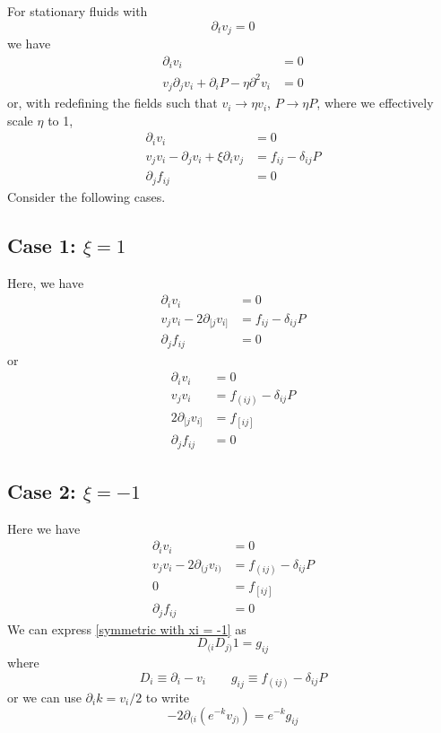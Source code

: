 \documentclass[10pt,a4paper]{article}
\begin{document}
For stationary fluids with
\begin{equation}
  \partial_t v_j = 0
\end{equation}
we have
\begin{align}
  \partial_i v_i  &=  0  \\
  v_j\partial_j v_i + \partial_i P - \eta\partial^2 v_i  &=  0
\end{align}
or, with redefining the fields such that $v_i \rightarrow \eta v_i$, $P \rightarrow \eta P$, where we effectively scale $\eta$ to 1,
\begin{align}
  \partial_i v_i  &=  0  \\
  v_j v_i - \partial_j v_i + \xi \partial_i v_j &=  f_{ij} - \delta_{ij} P  \\
  \partial_j f_{ij}  &=  0
\end{align}
Consider the following cases.

\subsection{Case 1: $\xi = 1$}
Here, we have
\begin{align}
  \partial_i v_i  &=  0  \\
  v_j v_i - 2\partial_{[j} v_{i]} &=  f_{ij} - \delta_{ij} P  \\
  \partial_j f_{ij}  &=  0
\end{align}
or
\begin{align}
  \partial_i v_i  &=  0  \\
  v_j v_i  &=  f_{(ij)} - \delta_{ij} P  \\
  2\partial_{[j} v_{i]} &=  f_{[ij]}  \\
  \partial_j f_{ij}  &=  0
\end{align}

\subsection{Case 2: $\xi = -1$}
Here we have
\begin{align}
  \partial_i v_i                      &=  0                          \\
  v_j v_i - 2\partial_{(j} v_{i)} &=  f_{(ij)} - \delta_{ij} P       \label{symmetric with xi = -1}\\
  0                                   &=  f_{[ij]}                   \\
  \partial_j f_{ij}                   &=  0
\end{align}
We can express \eqref{symmetric with xi = -1} as
\begin{equation}
  D_{(i} D_{j)} 1 = g_{ij}
\end{equation}
where
\begin{equation}
  D_i  \equiv  \partial_i - v_i    \qquad    g_{ij}  \equiv  f_{(ij)} - \delta_{ij} P
\end{equation}
or we can use $\partial_i k = v_i/2$ to write
\begin{equation}
  -2 \partial_{(i} ( e^{-k} v_{j)} )  =  e^{-k} g_{ij}
\end{equation}
\end{document}

